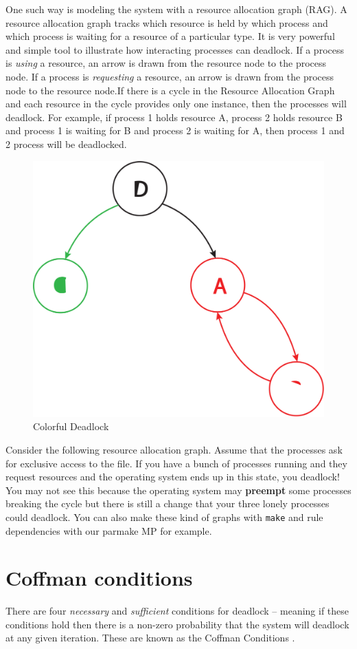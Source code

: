 One such way is modeling the system with a resource allocation graph (\gls{RAG}). A resource allocation graph tracks which resource is held by which process and which process is waiting for a resource of a particular type. It is very powerful and simple tool to illustrate how interacting processes can deadlock. If a process is \emph{using} a resource, an arrow is drawn from the resource node to the process node. If a process is \emph{requesting} a resource, an arrow is drawn from the process node to the resource node.If there is a cycle in the Resource Allocation Graph and each resource in the cycle provides only one instance, then the processes will deadlock. For example, if process 1 holds resource A, process 2 holds resource B and process 1 is waiting for B and process 2 is waiting for A, then process 1 and 2 process will be deadlocked.

\begin{figure}
  \begin{center}
\includegraphics[width=.25\textwidth]{deadlock/images/colorful.png}
\end{center}
  \caption{Colorful Deadlock}
\end{figure}

Consider the following resource allocation graph. Assume that the processes ask for exclusive access to the file. If you have a bunch of processes running and they request resources and the operating system ends up in this state, you deadlock! You may not see this because the operating system may \textbf{preempt} some processes breaking the cycle but there is still a change that your three lonely processes could deadlock. You can also make these kind of graphs with \texttt{make} and rule dependencies with our parmake MP for example.

\section{Coffman conditions}

There are four \emph{necessary} and \emph{sufficient} conditions for deadlock -- meaning if these conditions hold then there is a non-zero probability that the system will deadlock at any given iteration. These are known as the \gls{Coffman Conditions} \cite{coffman1971system}.

